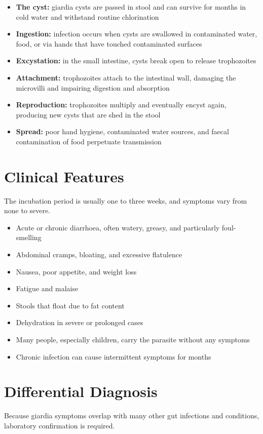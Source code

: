\begin{itemize}
    \item \textbf{The cyst:} giardia cysts are passed in stool and can survive for months in cold water and withstand routine chlorination
    \item \textbf{Ingestion:} infection occurs when cysts are swallowed in contaminated water, food, or via hands that have touched contaminated surfaces
    \item \textbf{Excystation:} in the small intestine, cysts break open to release trophozoites
    \item \textbf{Attachment:} trophozoites attach to the intestinal wall, damaging the microvilli and impairing digestion and absorption
    \item \textbf{Reproduction:} trophozoites multiply and eventually encyst again, producing new cysts that are shed in the stool
    \item \textbf{Spread:} poor hand hygiene, contaminated water sources, and faecal contamination of food perpetuate transmission
\end{itemize}

\section*{Clinical Features}
The incubation period is usually one to three weeks, and symptoms vary from none to severe.

\begin{itemize}
    \item Acute or chronic diarrhoea, often watery, greasy, and particularly foul-smelling
    \item Abdominal cramps, bloating, and excessive flatulence
    \item Nausea, poor appetite, and weight loss
    \item Fatigue and malaise
    \item Stools that float due to fat content
    \item Dehydration in severe or prolonged cases
    \item Many people, especially children, carry the parasite without any symptoms
    \item Chronic infection can cause intermittent symptoms for months
\end{itemize}

\section*{Differential Diagnosis}
Because giardia symptoms overlap with many other gut infections and conditions, laboratory confirmation is required.

